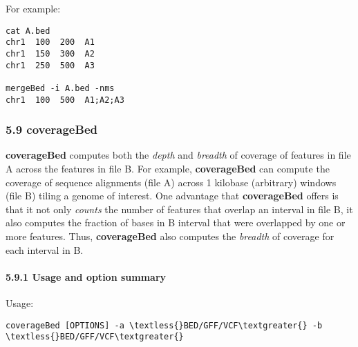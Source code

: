 \documentclass[letterpaper,10pt,english]{sphinxmanual}
\begin{document}
For example:

\begin{Verbatim}[commandchars=\\\{\}]
cat A.bed
chr1  100  200  A1
chr1  150  300  A2
chr1  250  500  A3

mergeBed -i A.bed -nms
chr1  100  500  A1;A2;A3
\end{Verbatim}


\subsubsection{5.9 coverageBed}
\label{content/coverageBed:coveragebed}\label{content/coverageBed::doc}
\textbf{coverageBed} computes both the \emph{depth} and \emph{breadth} of coverage of features in file A across the features
in file B. For example, \textbf{coverageBed} can compute the coverage of sequence alignments (file A) across 1
kilobase (arbitrary) windows (file B) tiling a genome of interest. One advantage that \textbf{coverageBed}
offers is that it not only \emph{counts} the number of features that overlap an interval in file B, it also
computes the fraction of bases in B interval that were overlapped by one or more features. Thus,
\textbf{coverageBed} also computes the \emph{breadth} of coverage for each interval in B.


\paragraph{5.9.1 Usage and option summary}
\label{content/coverageBed:usage-and-option-summary}
Usage:

\begin{Verbatim}[commandchars=\\\{\}]
coverageBed [OPTIONS] -a \textless{}BED/GFF/VCF\textgreater{} -b \textless{}BED/GFF/VCF\textgreater{}
\end{Verbatim}
\end{document}

